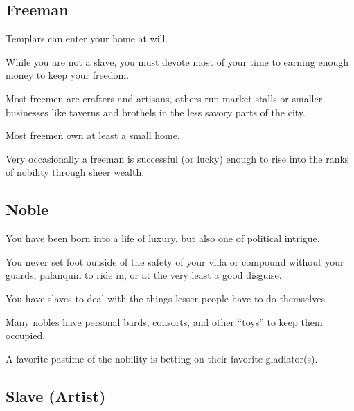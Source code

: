 \begin{multicols}{2}

\subsection{Freeman}

\begin{description}
    \item Templars can enter your home at will.
    \item While you are not a slave, you must devote most of your time to earning enough money to keep your freedom.
    \item Most freemen are crafters and artisans, others run market stalls or smaller businesses like taverns and brothels in the less savory parts of the city.
    \item Most freemen own at least a small home.
    \item Very occasionally a freeman is successful (or lucky) enough to rise into the ranks of nobility through sheer wealth.
\end{description}

\subsection{Noble}

\begin{description}
    \item You have been born into a life of luxury, but also one of political intrigue.
    \item You never set foot outside of the safety of your villa or compound without your guards, palanquin to ride in, or at the very least a good disguise.
    \item You have slaves to deal with the things lesser people have to do themselves.
    \item Many nobles have personal bards, consorts, and other “toys” to keep them occupied.
    \item A favorite pastime of the nobility is betting on their favorite gladiator(s).
\end{description}

\subsection{Slave (Artist)}


\end{multicols}
